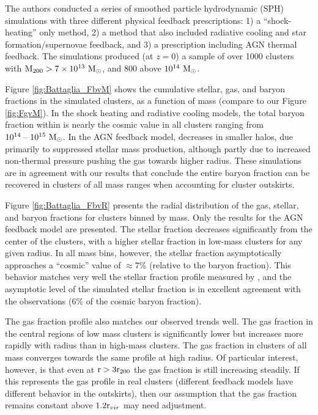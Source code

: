 The authors conducted a series of smoothed particle hydrodynamic (SPH)
simulations with three different physical feedback prescriptions: 1) a
``shock-heating'' only method, 2) a method that also included
radiative cooling and star formation/supernovae feedback, and 3) a
prescription including AGN thermal feedback. The simulations produced
(at $z=0$) a sample of over 1000 clusters with $\textrm{M\ensuremath{_{200}}} >
7\times 10^{13}~\textrm{M}_\odot{}$, and 800 above $10^{14}~\textrm{M}_\odot{}$.



Figure \ref{fig:Battaglia_FbvM} shows the cumulative stellar, gas, and
baryon fractions in the simulated clusters, as a function of mass
(compare to our Figure \ref{fig:FgvM}). In the shock heating and
radiative cooling models, the total baryon fraction within
\rtwo{} is nearly the cosmic value in all clusters ranging from
$10^{14}\;\textrm{--}\;10^{15}~\textrm{M}_\odot{}$. In the AGN feedback model, \fb{}
decreases in smaller halos, due primarily to suppressed stellar mass
production, although partly due to increased non-thermal
pressure pushing the gas towards higher radius. These simulations are
in agreement with our results that conclude the entire baryon
fraction can be recovered in clusters of all mass ranges when
accounting for cluster outskirts.



Figure \ref{fig:Battaglia_FbvR} presents the radial distribution of
the gas, stellar, and baryon fractions for clusters binned by
mass. Only the results for the AGN feedback model are presented. The
stellar fraction decreases significantly from the center of the
clusters, with a higher stellar fraction in low-mass clusters for any
given radius. In all mass bins, however, the stellar fraction
asymptotically approaches a ``cosmic'' value of $\approx7\%$ (relative
to the baryon fraction). This behavior matches very well the stellar
fraction profile measured by \citet{Bahcall2014}, and the asymptotic
level of the simulated stellar fraction is in excellent agreement with
the observations ($6\%$ of the cosmic baryon
fraction).

The gas fraction profile also matches our observed trends well. The
gas fraction in the central regions of low mass clusters is
significantly lower but increases more rapidly with radius than in
high-mass clusters. The gas fraction in clusters of all mass converges
towards the same profile at high radius. Of particular interest,
however, is that even at $\textrm{r}{}>3\textrm{r\ensuremath{_{200}}}{}$ the gas fraction is
still increasing steadily. If this represents the gas profile in real
clusters (different feedback models have different behavior in the
outskirts), then our assumption that the gas fraction remains
constant above $1.2\textrm{r\ensuremath{_{vir}}}{}$ may need adjustment.

